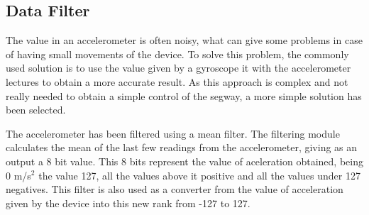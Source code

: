 \subsection{Data Filter}

The value in an accelerometer is often noisy, what can give some problems in case of having small movements of the device.
To solve this problem, the commonly used solution is to use the value given by a gyroscope it with the accelerometer lectures to obtain a more accurate result.
As this approach is complex and not really needed to obtain a simple control of the segway, a more simple solution has been selected.

The accelerometer has been filtered using a mean filter.
The filtering module calculates the mean of the last few readings from the accelerometer, giving as an output a 8 bit value.
This 8 bits represent the value of aceleration obtained, being 0 m/s$^{2}$ the value 127, all the values above it positive and all the values under 127 negatives.
This filter is also used as a converter from the value of acceleration given by the device into this new rank from -127 to 127.